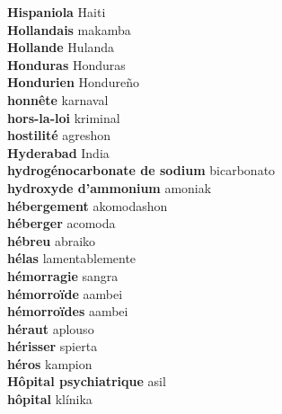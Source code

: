 \textbf{ Hispaniola  } Haiti \\
\textbf{ Hollandais  } makamba \\
\textbf{ Hollande  } Hulanda \\
\textbf{ Honduras  } Honduras \\
\textbf{ Hondurien  } Hondureño \\
\textbf{ honnête  } karnaval \\
\textbf{ hors-la-loi  } kriminal \\
\textbf{ hostilité  } agreshon \\
\textbf{ Hyderabad  } India \\
\textbf{ hydrogénocarbonate de sodium  } bicarbonato \\
\textbf{ hydroxyde d’ammonium  } amoniak \\
\textbf{ hébergement  } akomodashon \\
\textbf{ héberger  } acomoda \\
\textbf{ hébreu  } abraiko \\
\textbf{ hélas  } lamentablemente \\
\textbf{ hémorragie  } sangra \\
\textbf{ hémorroïde  } aambei \\
\textbf{ hémorroïdes  } aambei \\
\textbf{ héraut  } aplouso \\
\textbf{ hérisser  } spierta \\
\textbf{ héros  } kampion \\
\textbf{ Hôpital psychiatrique  } asil \\
\textbf{ hôpital  } klínika \\

